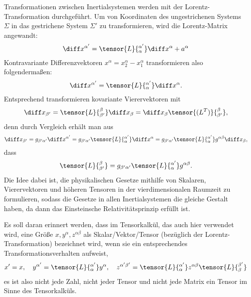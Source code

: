 Transformationen zwischen Inertialsystemen werden mit der Lorentz-Transformation durchgeführt.
Um von Koordinaten des ungestrichenen Systems $\Sigma$ in das gestrichene System $\Sigma'$ zu transformieren, wird die Lorentz-Matrix angewandt:
\begin{align*}
    \diff x^{\alpha'}=\tensor{L}{^{\alpha'}_\alpha}\diff x^\alpha + a^\alpha
\end{align*}
Kontravariante Differenzvektoren $x^\alpha=x^\alpha_2-x^\alpha_1$ transformieren also folgendermaßen:
\begin{align*}
    \diff x^{\alpha'}=\tensor{L}{^{\alpha'}_\alpha}\diff x^\alpha.
\end{align*}
Entsprechend transformieren kovariante Vierervektoren mit
\begin{align*}
    \diff x_{\beta'}=\tensor{L}{_{\beta'}^\beta}\diff x_\beta =\diff x_\beta \tensor{(L^T)}{^\beta_{\beta'}},
\end{align*}
denn durch Vergleich erhält man aus
\begin{align*}
    \diff x_{\beta'}=g_{\beta'\alpha'}\diff x^{\alpha'}=g_{\beta'\alpha'}\tensor{L}{^{\alpha'}_\alpha}\diff x^\alpha=g_{\beta'\alpha'}\tensor{L}{^{\alpha'}_\alpha}g^{\alpha\beta}\diff x_\beta,
\end{align*}
dass
\begin{align*}
    \tensor{L}{_{\beta'}^\beta}=g_{\beta'\alpha'}\tensor{L}{^{\alpha'}_\alpha}g^{\alpha\beta}.
\end{align*}
Die Idee dabei ist, die physikalischen Gesetze mithilfe von Skalaren, Vierervektoren und höheren Tensoren in der vierdimensionalen Raumzeit zu formulieren, sodass die Gesetze in allen Inertialsystemen die gleiche Gestalt haben, da dann das Einsteinsche Relativitätsprinzip erfüllt ist.

Es soll daran erinnert werden, dass im Tensorkalkül, das auch hier verwendet wird, eine Größe $x,y^\alpha,z^{\alpha\beta}$ als Skalar/Vektor/Tensor (bezüglich der Lorentz-Transformation) bezeichnet wird, wenn sie ein entsprechendes Transformationsverhalten aufweist,
\begin{align*}
    x' = x , \quad y^{\alpha'}=\tensor{L}{^{\alpha'}_\alpha}y^\alpha, \quad z^{\alpha'\beta'}=\tensor{L}{^{\alpha'}_\alpha}z^{\alpha\beta}\tensor{L}{_\beta^{\beta'}}
\end{align*}
\textendash{} es ist also nicht jede Zahl, nicht jeder Tensor und nicht jede Matrix ein Tensor im Sinne des Tensorkalküls.

